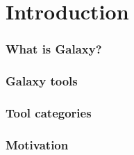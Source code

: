 \chapter{Introduction}\label{chap:introduction}
    \subsection{What is Galaxy?}

    \subsection{Galaxy tools}

    \subsection{Tool categories}

    \subsection{Motivation}
